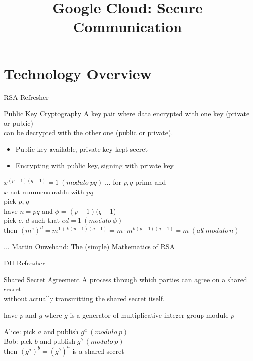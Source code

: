 \RequirePackage{slides-shared}
\title{Google Cloud: Secure Communication}



\makepreamble

\section{Technology Overview}


\begin{frame}{RSA Refresher}
    \begin{block}{Public Key Cryptography}
        A key pair where data encrypted with one key (private or public) \\
        can be decrypted with the other one (public or private).
        \begin{itemize}
            \item Public key available, private key kept secret
            \item Encrypting with public key, signing with private key
        \end{itemize}
    \end{block}

    \bigskip

    $x^{(p-1)(q-1)} = 1 ~ (modulo ~ pq)$ \hfill ... for $p, q$ prime and \\ \hfill $x$ not commensurable with $pq$ \\
    pick $p$, $q$ \\
    have $n = pq$ and $\phi = (p-1)(q-1$) \\
    pick $e$, $d$ such that $ed = 1 ~ (modulo ~ \phi)$ \\
    then $(m^e)^d = m^{1+k(p-1)(q-1)} = m \cdot m^{k(p-1)(q-1)} = m ~ (all ~ modulo ~ n)$ \\

    \bigskip

    \hfill ... Martin Ouwehand: The (simple) Mathematics of RSA
\end{frame}


\begin{frame}{DH Refresher}
    \begin{block}{Shared Secret Agreement}
        A process through which parties can agree on a shared secret \\
        without actually transmitting the shared secret itself.
    \end{block}

    \bigskip

    have $p$ and $g$ where $g$ is a generator of multiplicative integer group modulo $p$ \\

    \bigskip

    Alice: pick $a$ and publish $g^a ~ (modulo ~ p)$ \\
    Bob: pick $b$ and publish $g^b ~ (modulo ~ p)$ \\

    then $(g^a)^b = (g^b)^a$ is a shared secret \\

\end{frame}


